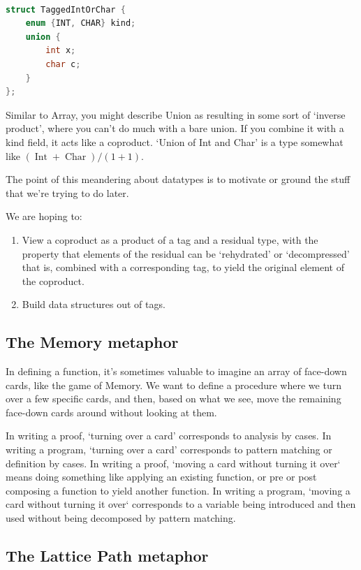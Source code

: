 \documentclass{proc-l}
\theoremstyle{definition}
\theoremstyle{remark}
\numberwithin{equation}{section}
\begin{document}
\begin{lstlisting}[language=C]

struct TaggedIntOrChar {
    enum {INT, CHAR} kind;
    union {
        int x;
        char c;
    }
};
\end{lstlisting}

Similar to Array, you might describe Union as resulting in some sort of `inverse product',
where you can't do much with a bare union. If you combine it with a kind field,
it acts like a coproduct. `Union of Int and Char' is a type somewhat 
like \((\operatorname{Int} + \operatorname{Char}) / (1 + 1)\).

The point of this meandering about datatypes is to motivate or ground the stuff that we're trying to do later.

We are hoping to:
\begin{enumerate}
\item View a coproduct as a product of a tag and a residual type, with the property that elements of the residual can be `rehydrated' or `decompressed' that is, combined with a corresponding tag, to yield the original element of the coproduct.
\item Build data structures out of tags.
\end{enumerate}

\subsection{The Memory metaphor}
In defining a function, it's sometimes valuable to imagine an array of face-down cards, like the game of Memory. We want to define a procedure where we turn over a few specific cards, and then, 
based on what we see, move the remaining face-down cards around without looking at them.

In writing a proof, `turning over a card' corresponds to analysis by cases. In writing a program, `turning over a card' corresponds to pattern matching or definition by cases. In writing a proof, `moving a card without turning it over` means doing something like applying an existing function, or pre or post composing a function to yield another function. In writing a program, `moving a card without turning it over` corresponds to a variable being introduced and then used without being decomposed by pattern matching. 

\subsection{The Lattice Path metaphor}
\end{document}
